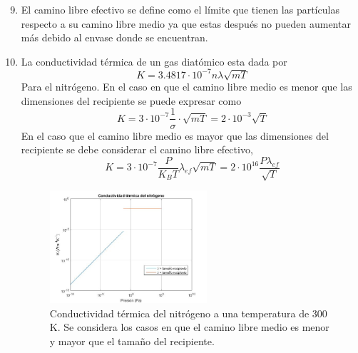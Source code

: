 \begin{enumerate}[resume]

\setcounter{enumi}{8}
\item %
El camino libre efectivo se define como el límite que tienen las partículas respecto a su camino libre medio ya que estas después no pueden aumentar más debido al envase donde se encuentran. 

\item %
La conductividad térmica de un gas diatómico esta dada por 
\begin{equation}
    K = 3.4817\cdot 10^{-7} n\lambda \sqrt{mT}
\end{equation}
Para el nitrógeno. En el caso en que el camino libre medio es menor que las dimensiones del recipiente se puede expresar como 
\begin{equation}
    K = 3\cdot 10^{-7} \frac{1}{\sigma}\cdot \sqrt{mT} = 2 \cdot 10^{-3} \sqrt{T}
\end{equation}
En el caso que el camino libre medio es mayor que las dimensiones del recipiente se debe considerar el camino libre efectivo,
\begin{equation}
    K = 3\cdot 10^{-7}\frac{P}{K_BT}\lambda_{ef} \sqrt{mT} = 2 \cdot 10^{16}\frac{P\lambda_{ef}}{\sqrt{T}}
\end{equation}
\begin{figure}
    \centering
    \includegraphics[width=0.55\textwidth]{Imagenes/Unidad/U2/grafp10.jpg}
    \caption{Conductividad térmica del nitrógeno a una temperatura de 300 K. Se considera los casos en que el camino libre medio es menor y mayor que el tamaño del recipiente.}
    \label{fig:my_label}
\end{figure}


\end{enumerate}



